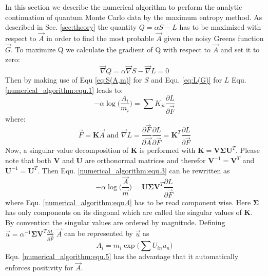 In this section we describe the numerical algorithm to perform the analytic continuation of quantum Monte Carlo data by the maximum entropy method. As described in Sec. \ref{sec:theory} the quantity $Q = \alpha S - L$ has to be maximized with respect to $\vec A$ in order to find the most probable $\vec A$ given the noisy Greens function $\vec G$. To maximize Q we calculate the gradient of Q with respect to $\vec A$ and set it to zero:
\begin{equation}
	\vec\nabla Q =  \alpha \vec\nabla S - \vec\nabla L = 0
	\label{numerical_algorithm:equ.1}
\end{equation}
Then by making use of Equ \ref{eq:S(A,m)} for $S$ and Equ. \ref{eq:L(G)} for $L$ Equ. \ref{numerical_algorithm:equ.1} leads to:
\begin{equation}
	- \alpha \log \bigg(\frac{A_i}{m_i} \bigg) = \sum K_{ji} \frac{\partial L}{\partial \vec F}
	\label{numerical_algorithm:equ.2}
\end{equation}
where:
\begin{equation}
	\vec F = \mathbf{K} \vec A \text{ and } \vec \nabla L = \frac{\partial \vec F}{\partial \vec A} \frac{\partial L}{\partial \vec F} = \mathbf{K}^T \frac{\partial L}{\partial \vec F}
	\label{numerical_algorithm:equ.3}
\end{equation}
Now, a singular value decomposition of $\mathbf{K}$ is performed with $\mathbf{K} = \mathbf{V} \mathbf{\Sigma} \mathbf{U}^T$. Please note that both $\mathbf{V}$ and $\mathbf{U}$ are orthonormal matrices and therefor $\mathbf{V}^{-1}=\mathbf{V}^T$ and $\mathbf{U}^{-1}=\mathbf{U}^T$. Then Equ. \ref{numerical_algorithm:equ.3} can be rewritten as
\begin{equation}
	-\alpha \log \bigg(\frac{\vec A}{\vec m}\bigg) = \mathbf{U} \mathbf{\Sigma} \mathbf{V}^T \frac{\partial L}{\partial \vec F} 
	\label{numerical_algorithm:equ.4}
\end{equation}
where Equ. \ref{numerical_algorithm:equ.4} has to be read component wise.
Here $\mathbf{\Sigma}$ has only components on its diagonal which are called the singular values of $\mathbf{K}$. By convention the singular values are ordered by magnitude. Defining $\vec u = \alpha^{-1} \mathbf{\Sigma} \mathbf{V}^T \frac{\partial L}{\partial \vec F}$ $\vec A$ can be represented by $\vec u$ as
\begin{equation}
	A_i = m_i \exp \Big(\sum U_{in}u_n\Big)
	\label{numerical_algorithm:equ.5}
\end{equation}
Equ. \ref{numerical_algorithm:equ.5} has the advantage that it automatically enforces positivity for $\vec A$.
